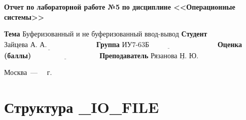 \documentclass[12pt]{report}
\begin{document}
\begin{titlepage}
		\begin{center}
			\noindent\begin{minipage}{1.1\textwidth}\centering
				\Large\textbf{  Отчет по лабораторной работе №5}\newline
				\textbf{по дисциплине <<Операционные системы>>}\newline\newline\newline
			\end{minipage}
		\end{center}
		
		\noindent\textbf{Тема} $\underline{\text{Буферизованный и не буферизованный ввод-вывод}}$\newline\newline
		\noindent\textbf{Студент} $\underline{\text{Зайцева А. А.~~~~~~~~~~~~~~~~~~~~}}$\newline\newline
		\noindent\textbf{Группа} $\underline{\text{ИУ7-63Б~~~~~~~~~~~~~~~~~~~~~~~~~~~~}}$\newline\newline
		\noindent\textbf{Оценка (баллы)} $\underline{\text{~~~~~~~~~~~~~~~~~~~~~~~~~~~}}$\newline\newline
		\noindent\textbf{Преподаватель} $\underline{\text{Рязанова Н. Ю.~~~~~~~}}$\newline\newline\newline
		
		\begin{center}
			\vfill
			Москва~---~\the\year
			~г.
		\end{center}
	\end{titlepage}


\chapter*{Структура \_IO\_FILE}
\end{document}
